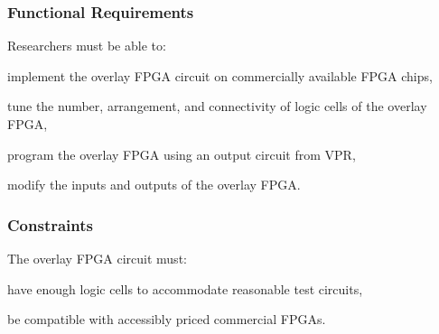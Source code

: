 %


\subsubsection{Functional Requirements}

Researchers must be able to:
\begin{itemlist}
	\item implement the overlay FPGA circuit on commercially available FPGA chips,
	\item tune the number, arrangement, and connectivity of logic cells of the overlay FPGA,
	\item program the overlay FPGA using an output circuit from VPR,
	\item modify the inputs and outputs of the overlay FPGA.
\end{itemlist}


\subsubsection{Constraints}

The overlay FPGA circuit must:
\begin{itemlist}
	\item have enough  logic cells to accommodate reasonable test circuits,
	\item be compatible with accessibly priced commercial FPGAs.
\end{itemlist}


